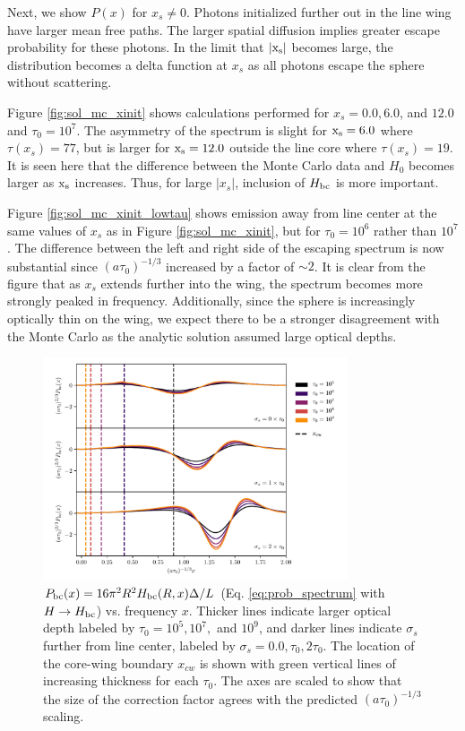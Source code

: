 \documentclass[linenumbers]{aastex63}
\begin{document}
Next, we show $P(x)$ for $x_s \neq 0$. Photons initialized further out in the line wing have larger mean free paths. The larger spatial diffusion implies greater escape probability for these photons. In the limit that $|\rm x_s|$ becomes large, the distribution becomes a delta function at $x_s$ as all photons escape the sphere without scattering. 

Figure \ref{fig:sol_mc_xinit} shows calculations performed for $x_s = 0.0, 6.0$, and $12.0$ and $\tau_0=10^7$. The asymmetry of the spectrum is slight for $\rm x_s = 6.0$ where $\tau(x_s)=77$, but is larger for $\rm x_s=12.0$ outside the line core where $\tau(x_s)=19$. It is seen here that the difference between the Monte Carlo data and $H_0$ becomes larger as $\rm x_s$ increases. Thus, for large $|x_s|$, inclusion of $H_{\rm bc}$ is more important.

Figure \ref{fig:sol_mc_xinit_lowtau} shows emission away from line center at the same values of $x_s$ as in Figure \ref{fig:sol_mc_xinit}, but for $\tau_0=10^6$ rather than $10^7$. The difference between the left and right side of the escaping spectrum is now substantial since $(a\tau_0)^{-1/3}$ increased by a factor of ${\sim}2$. It is clear from the figure that as $x_s$ extends further into the wing, the spectrum becomes more strongly peaked in frequency. Additionally, since the sphere is increasingly optically thin on the wing, we expect there to be a stronger disagreement with the Monte Carlo as the analytic solution assumed large optical depths.

\begin{figure}
    \centering
    \includegraphics[width=0.8\textwidth]{xinit.pdf}
    \caption{$P_{\rm bc}(x) = 16\pi^2R^2H_{\rm bc}(R, x)\Delta/L$ (Eq. \ref{eq:prob_spectrum} with $H \rightarrow H_{\rm bc}$) vs. frequency $x$. Thicker lines indicate larger optical depth labeled by $\tau_0=10^5, 10^7,$ and $10^9$, and darker lines indicate $\sigma_s$ further from line center, labeled by $\sigma_s=0.0, \tau_0, 2\tau_0$. The location of the core-wing boundary $x_{cw}$ is shown with green vertical lines of increasing thickness for each $\tau_0$. The axes are scaled to show that the size of the correction factor agrees with the predicted $(a\tau_0)^{-1/3}$ scaling.}
    \label{fig:xinit}
\end{figure}
\end{document}
